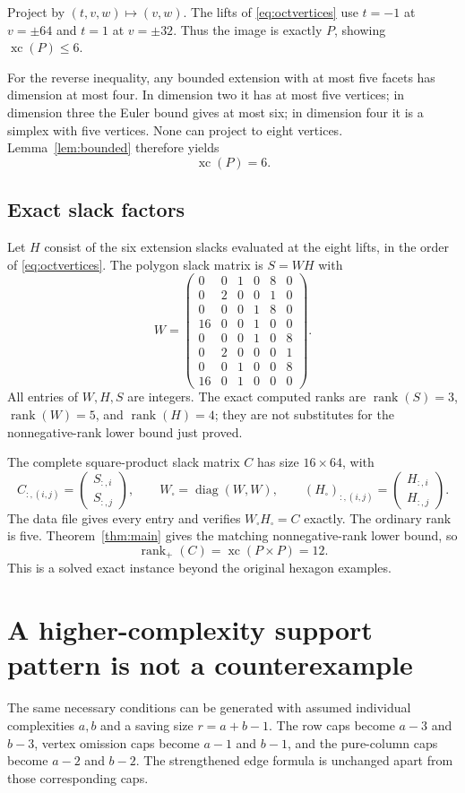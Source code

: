 \documentclass[11pt,a4paper]{article}
\newcommand{\xc}{\operatorname{xc}}
\newcommand{\rankp}{\operatorname{rank}_{+}}
\newcommand{\rank}{\operatorname{rank}}
\theoremstyle{definition}\newtheorem{definition}[theorem]{Definition}
\theoremstyle{remark}\newtheorem{remark}[theorem]{Remark}
\begin{document}
Project by $(t,v,w)\mapsto(v,w)$. The lifts of \eqref{eq:octvertices} use
$t=-1$ at $v=\pm64$ and $t=1$ at $v=\pm32$. Thus the image is exactly $P$,
showing $\xc(P)\le6$.

For the reverse inequality, any bounded extension with at most five facets
has dimension at most four. In dimension two it has at most five vertices;
in dimension three the Euler bound gives at most six; in dimension four it
is a simplex with five vertices. None can project to eight vertices.
Lemma~\ref{lem:bounded} therefore yields
\[
 \boxed{\xc(P)=6.}
\]

\subsection{Exact slack factors}
Let $H$ consist of the six extension slacks evaluated at the eight lifts, in
the order of \eqref{eq:octvertices}. The polygon slack matrix is $S=WH$ with
\[
 W=\begin{pmatrix}
0&0&1&0&8&0\\
0&2&0&0&1&0\\
0&0&0&1&8&0\\
16&0&0&1&0&0\\
0&0&0&1&0&8\\
0&2&0&0&0&1\\
0&0&1&0&0&8\\
16&0&1&0&0&0
\end{pmatrix}.
\]
All entries of $W,H,S$ are integers. The exact computed ranks are
$\rank(S)=3$, $\rank(W)=5$, and $\rank(H)=4$; they are not substitutes for the
nonnegative-rank lower bound just proved.

The complete square-product slack matrix $C$ has size $16\times64$, with
\[
 C_{:,(i,j)}=\begin{pmatrix}S_{:,i}\\S_{:,j}\end{pmatrix},\qquad
 W_{\square}=\operatorname{diag}(W,W),\qquad
 (H_{\square})_{:,(i,j)}=\begin{pmatrix}H_{:,i}\\H_{:,j}\end{pmatrix}.
\]
The data file gives every entry and verifies $W_{\square}H_{\square}=C$
exactly. The ordinary rank is five. Theorem~\ref{thm:main} gives the matching
nonnegative-rank lower bound, so
\[
 \boxed{\rankp(C)=\xc(P\times P)=12.}
\]
This is a solved exact instance beyond the original hexagon examples.

\section{A higher-complexity support pattern is not a counterexample}\label{sec:barrier}
The same necessary conditions can be generated with assumed individual
complexities $a,b$ and a saving size $r=a+b-1$. The row caps become
$a-3$ and $b-3$, vertex omission caps become $a-1$ and $b-1$, and the pure-column
caps become $a-2$ and $b-2$. The strengthened edge formula is unchanged apart
from those corresponding caps.
\end{document}
